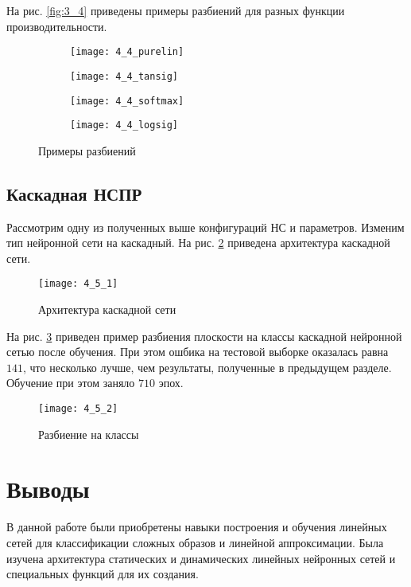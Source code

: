 На рис. \ref{fig:3_4} приведены примеры разбиений для разных функции производительности.
\begin{figure}[H]
\begin{center}
	\begin{subfigure}[b]{0.49\textwidth}
		\texttt{[image: 4\_4\_purelin]}
		\caption{}
	\end{subfigure}
	\begin{subfigure}[b]{0.49\textwidth}
		\texttt{[image: 4\_4\_tansig]}
		\caption{}
	\end{subfigure}
	\begin{subfigure}[b]{0.49\textwidth}
		\texttt{[image: 4\_4\_softmax]}
		\caption{}
	\end{subfigure}
	\begin{subfigure}[b]{0.49\textwidth}
		\texttt{[image: 4\_4\_logsig]}
		\caption{}
	\end{subfigure}
	\caption{Примеры разбиений}
	\label{fig:4_4}
\end{center}
\end{figure}

\subsection{Каскадная НСПР}

Рассмотрим одну из полученных выше конфигураций НС и параметров. Изменим тип нейронной сети на каскадный. На рис. \ref{fig:4_5_1} приведена архитектура каскадной сети.
\begin{figure}[H]
\begin{center}
	\texttt{[image: 4\_5\_1]}
	\caption{Архитектура каскадной сети}
	\label{fig:4_5_1}
\end{center}
\end{figure}

\vspace{-0.5cm}
На рис. \ref{fig:4_5_2} приведен пример разбиения плоскости на классы каскадной нейронной сетью после обучения. При этом ошбика  на тестовой выборке оказалась равна $141$, что несколько лучше, чем результаты, полученные в предыдущем разделе. Обучение при этом заняло $710$ эпох.
\begin{figure}[H]
\begin{center}
	\texttt{[image: 4\_5\_2]}
	\caption{Разбиение на классы}
	\label{fig:4_5_2}
\end{center}
\end{figure}
\vspace{-1cm}

\section{Выводы}

В данной работе были приобретены навыки построения и обучения линейных сетей для классификации сложных образов и линейной аппроксимации. Была изучена архитектура статических и динамических линейных нейронных сетей и специальных функций для их создания.

